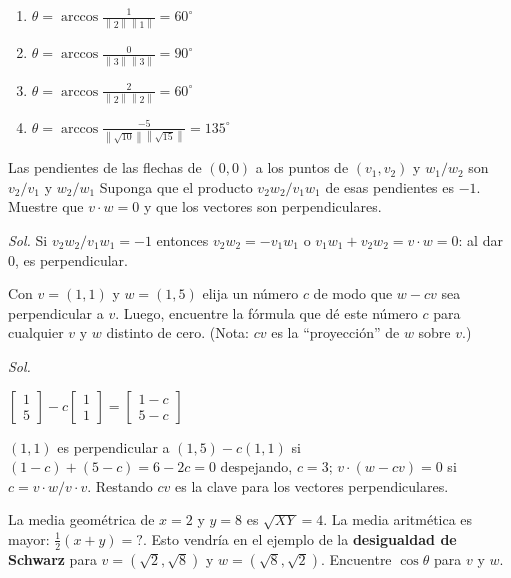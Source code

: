\begin{enumerate}
	\item $\theta = \arccos \frac{1}{\left \| 2 \right \| \left \| 1 \right \|} = 60^{\circ}$
	\item $\theta = \arccos \frac{0}{\left \| 3 \right \| \left \| 3 \right \|} = 90^{\circ}$
	\item $\theta = \arccos \frac{2}{\left \| 2 \right \| \left \| 2 \right \|} = 60^{\circ}$
	\item $\theta = \arccos \frac{-5}{\left \| \sqrt{10} \right \| \left \| \sqrt{15} \right \|}= 135^{\circ}$
\end{enumerate}

\begin{problem}
Las pendientes de las flechas de $(0,0)$ a los puntos de $(v_{1}, v_2 )$ y $w_1/ w_2 $ son $v_2 /v_{1}$ y $w_2/ w_{1}$
Suponga que el producto $v_2 w_2/ v_1w_{1}$ de esas pendientes es $-1$. Muestre que $v \cdot w = 0$ y
que los vectores son perpendiculares.
\end{problem}

\textit{ Sol. }
Si $v_2 w_2 /v_{1}w_1= -1$ entonces $v_2w_2= -v_1w_{1}$ o $v_1w_1+ v_2w_2= v \cdot w = 0$: al dar 0, es perpendicular.

\begin{problem}
Con $v = (1, 1)$ y $w = (1, 5)$ elija un número $c$ de modo que $w - cv$ sea perpendicular
a $v$. Luego, encuentre la fórmula que dé este número $c$ para cualquier $v$ y $w$ distinto de cero.
(Nota: $cv$ es la ``proyección'' de $w$ sobre $v$.)
\end{problem}

\textit{ Sol. }

$\begin{bmatrix} 1\\ 5 \end{bmatrix} - c \begin{bmatrix} 1\\1 \end{bmatrix} = \begin{bmatrix} 1-c\\5-c \end{bmatrix}$

$(1,1)$ es perpendicular a $(1,5) - c (1, 1)$ si $(1-c)+(5-c)=6 - 2c = 0$ despejando, $c = 3$; $v \cdot (w - cv) = 0$ si
$c=v\cdot w / v\cdot v$. Restando $cv$ es la clave para los vectores perpendiculares.

\begin{problem}
La media geométrica de $x = 2$ y $y = 8$ es $\sqrt{XY}= 4$. La media aritmética es mayor:
$\frac{1}{2} (x + y) = ?$. Esto vendría en el ejemplo de la \textbf{desigualdad de Schwarz}
para $v = (\sqrt{2}, \sqrt{8})$ y $w = (\sqrt{8} , \sqrt{2} )$. Encuentre $\cos \theta $ para $v$ y $w$.
\end{problem}

